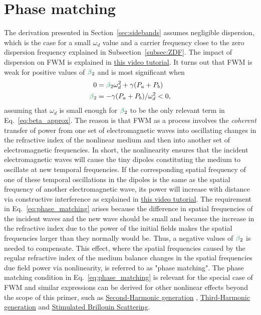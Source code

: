 \section{Phase matching}
\label{sec:Phase_matching}
The derivation presented in Section~\ref{sec:sidebands} assumes negligible dispersion, which is the case for a small $\omega_d$ value and a carrier frequency close to the zero dispersion frequency explained in Subsection~\ref{subsec:ZDF}. The impact of dispersion on FWM is explained in \href{https://youtu.be/0SXPvO89jto}{this video tutorial}. It turns out that FWM is weak for positive values of $\betag_2$ and is most significant when
\begin{align}
\label{eq:phase_matching}
0&=\betag_2\omega_d^2+\gamma(P_a+P_b)    \\ \nonumber
\betag_2&=-\gamma(P_a+P_b)/\omega_d^2<0,    
\end{align}
assuming that $\omega_d$ is small enough for $\betag_2$ to be the only relevant term in Eq.~\ref{eq:beta_approx}. The reason is that FWM as a process involves the \emph{coherent} transfer of power from one set of electromagnetic waves into oscillating changes in the refractive index of the nonlinear medium and then into another set of electromagnetic frequencies. In short, the nonlinearity ensures that the incident electromagnetic waves will cause the tiny dipoles constituting the medium to oscillate at new temporal frequencies. If the corresponding spatial frequency of one of these temporal oscillations in the dipoles is the same as the spatial frequency of another electromagnetic wave, its power will increase with distance via constructive interference as explained in \href{https://youtu.be/bha8SzWzRc4}{this video tutorial}. The requirement in Eq.~\ref{eq:phase_matching} arises because the difference in spatial frequencies of the incident waves and the new wave should be small and because the increase in the refractive index due to the power of the initial fields makes the spatial frequencies larger than they normally would be. Thus, a negative values of $\betag_2$ is needed to compensate. This effect, where the spatial frequencies caused by the regular refractive index of the medium balance changes in the spatial frequencies due field power via nonlinearity, is referred to as "phase matching". The phase matching condition in Eq.~\ref{eq:phase_matching} is relevant for the special case of FWM and similar expressions can be derived for other nonlinear effects beyond the scope of this primer, such as \href{https://www.youtube.com/watch?v=UpuN0dS23Nw}{Second-Harmonic generation} , \href{https://youtu.be/bha8SzWzRc4}{Third-Harmonic generation} and \href{https://www.creol.ucf.edu/mir/wp-content/uploads/sites/7/2023/07/L22_-Stimulated-Brillouin-scattering.pdf}{Stimulated Brillouin Scattering}.  

